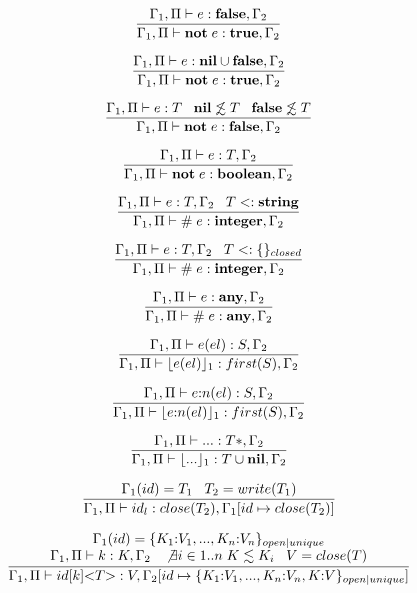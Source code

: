 \[
\dfrac{\Gamma_{1}, \Pi \vdash e:\mathbf{false}, \Gamma_{2}}
      {\Gamma_{1}, \Pi \vdash \mathbf{not} \; e:\mathbf{true}, \Gamma_{2}}
\]

\[
\dfrac{\Gamma_{1}, \Pi \vdash e:\mathbf{nil} \cup \mathbf{false}, \Gamma_{2}}
      {\Gamma_{1}, \Pi \vdash \mathbf{not} \; e:\mathbf{true}, \Gamma_{2}}
\]

\[
\dfrac{\Gamma_{1}, \Pi \vdash e:T \;\;\;
       \mathbf{nil} \not\lesssim T \;\;\;
       \mathbf{false} \not\lesssim T}
      {\Gamma_{1}, \Pi \vdash \mathbf{not} \; e:\mathbf{false}, \Gamma_{2}}
\]

\[
\dfrac{\Gamma_{1}, \Pi \vdash e:T, \Gamma_{2}}
      {\Gamma_{1}, \Pi \vdash \mathbf{not} \; e:\mathbf{boolean}, \Gamma_{2}}
\]

\[
\dfrac{\Gamma_{1}, \Pi \vdash e:T, \Gamma_{2} \;\;\;
       T <: \mathbf{string}}
      {\Gamma_{1}, \Pi \vdash \# \; e:\mathbf{integer}, \Gamma_{2}}
\]

\[
\dfrac{\Gamma_{1}, \Pi \vdash e:T, \Gamma_{2} \;\;\;
       T <: \{\}_{closed}}
      {\Gamma_{1}, \Pi \vdash \# \; e:\mathbf{integer}, \Gamma_{2}}
\]

\[
\dfrac{\Gamma_{1}, \Pi \vdash e:\mathbf{any}, \Gamma_{2}}
      {\Gamma_{1}, \Pi \vdash \# \; e:\mathbf{any}, \Gamma_{2}}
\]

\[
\dfrac{\Gamma_{1}, \Pi \vdash e(el):S, \Gamma_{2}}
      {\Gamma_{1}, \Pi \vdash \lfloor e(el) \rfloor_{1}:first(S), \Gamma_{2}}
\]

\[
\dfrac{\Gamma_{1}, \Pi \vdash e{:}n(el):S, \Gamma_{2}}
      {\Gamma_{1}, \Pi \vdash \lfloor e{:}n(el) \rfloor_{1}:first(S), \Gamma_{2}}
\]

\[
\dfrac{\Gamma_{1}, \Pi \vdash {...}:T{*}, \Gamma_{2}}
      {\Gamma_{1}, \Pi \vdash \lfloor {...} \rfloor_{1}:T \cup \mathbf{nil}, \Gamma_{2}}
\]

\[
\dfrac{\Gamma_{1}(id) = T_{1} \;\;\; T_{2} = write(T_{1})}
      {\Gamma_{1}, \Pi \vdash id_{l}:close(T_{2}), \Gamma_{1}[id \mapsto close(T_{2})]}
\]

\[
\dfrac{\begin{array}{c}
       \Gamma_{1}(id) = \{ K_{1}{:}V_{1}, ..., K_{n}{:}V_{n} \}_{open|unique}\\
       \Gamma_{1}, \Pi \vdash k:K, \Gamma_{2} \;\;\;
       \not \exists i \in 1..n \; K \lesssim K_{i} \;\;\;
       V = close(T)
       \end{array}}
      {\Gamma_{1}, \Pi \vdash id[k] {<}T{>}:V, \Gamma_{2}[id \mapsto \{ K_{1}{:}V_{1}, ..., K_{n}{:}V_{n}, K{:}V\}_{open|unique}]}
\]

